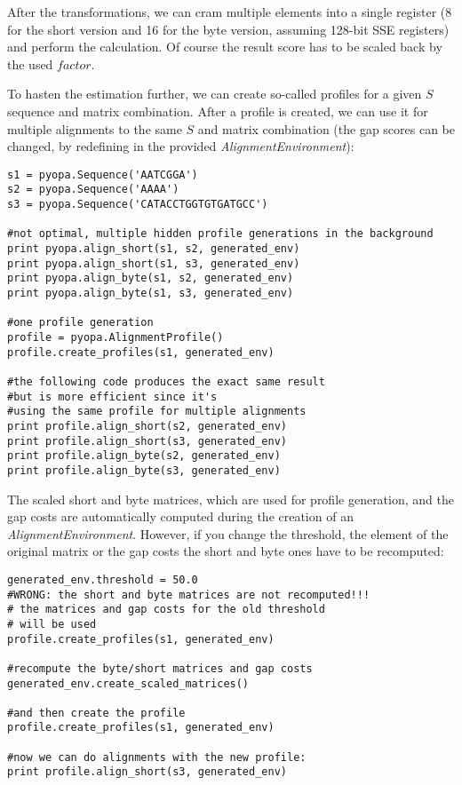 \documentclass[12pt]{article}
\newcommand{\alenv}{\emph{AlignmentEnvironment}}
\begin{document}
After the transformations, we can cram multiple elements into a single register (8 for the short version and 16 for the byte version, assuming 128-bit SSE registers) and perform the calculation. Of course the result score has to be scaled back by the used $factor$.

To hasten the estimation further, we can create so-called profiles for a given $S$ sequence and matrix combination. After a profile is created, we can use it for multiple alignments to the same $S$ and matrix combination (the gap scores can be changed, by redefining in the provided \alenv{}):

\begin{lstlisting}
s1 = pyopa.Sequence('AATCGGA')
s2 = pyopa.Sequence('AAAA')
s3 = pyopa.Sequence('CATACCTGGTGTGATGCC')

#not optimal, multiple hidden profile generations in the background
print pyopa.align_short(s1, s2, generated_env)
print pyopa.align_short(s1, s3, generated_env)
print pyopa.align_byte(s1, s2, generated_env)
print pyopa.align_byte(s1, s3, generated_env)

#one profile generation
profile = pyopa.AlignmentProfile()
profile.create_profiles(s1, generated_env)

#the following code produces the exact same result
#but is more efficient since it's
#using the same profile for multiple alignments
print profile.align_short(s2, generated_env)
print profile.align_short(s3, generated_env)
print profile.align_byte(s2, generated_env)
print profile.align_byte(s3, generated_env)
\end{lstlisting}

The scaled short and byte matrices, which are used for profile generation, and the gap costs are automatically computed during the creation of an \alenv{}. However, if you change the threshold, the element of the original matrix or the gap costs the short and byte ones have to be recomputed:
\begin{lstlisting}
generated_env.threshold = 50.0
#WRONG: the short and byte matrices are not recomputed!!!
# the matrices and gap costs for the old threshold
# will be used
profile.create_profiles(s1, generated_env)

#recompute the byte/short matrices and gap costs
generated_env.create_scaled_matrices()

#and then create the profile
profile.create_profiles(s1, generated_env)

#now we can do alignments with the new profile:
print profile.align_short(s3, generated_env)
\end{lstlisting}
\end{document}
